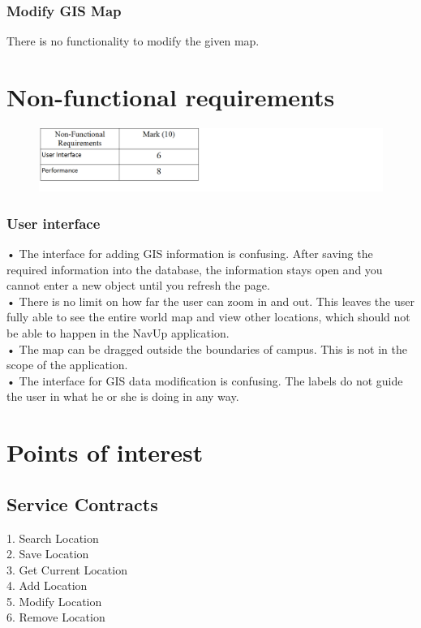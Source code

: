 \documentclass[english]{article}
\begin{document}
\subsubsection{Modify GIS Map}
There is no functionality to modify the given map.
\section{Non-functional requirements}
\begin{figure}[H]
\hspace*{-2.5cm}
\includegraphics[width=180mm]{NFRMarks.png}
\end{figure}
\subsubsection{User interface}
•	The interface for adding GIS information is confusing. After saving the required information into the database, the information stays open and you cannot enter a new object until you refresh the page.\\
•	There is no limit on how far the user can zoom in and out. This leaves the user fully able to see the entire world map and view other locations, which should not be able to happen in the NavUp application.\\
•	The map can be dragged outside the boundaries of campus. This is not in the scope of the application.\\
•	The interface for GIS data modification is confusing. The labels do not guide the user in what he or she is doing in any way.\\
\section{Points of interest}
\subsection{Service Contracts}
1. Search Location\\
2. Save Location\\
3. Get Current Location\\
4. Add Location\\
5. Modify Location\\
6. Remove Location\\
\end{document}
